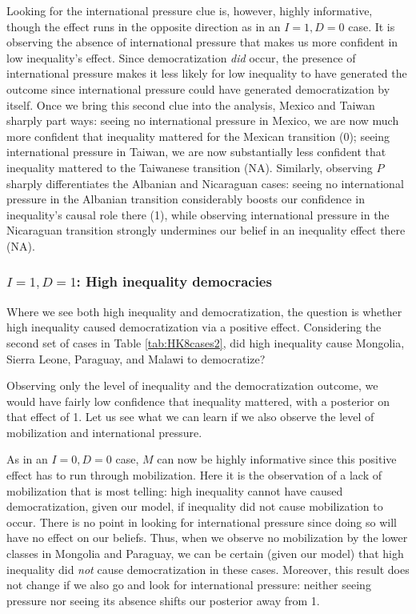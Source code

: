 \documentclass[12pt,]{book}
\begin{document}
Looking for the international pressure clue is, however, highly informative, though the effect runs in the opposite direction as in an \(I=1, D=0\) case. It is observing the absence of international pressure that makes us more confident in low inequality's effect. Since democratization \emph{did} occur, the presence of international pressure makes it less likely for low inequality to have generated the outcome since international pressure could have generated democratization by itself. Once we bring this second clue into the analysis, Mexico and Taiwan sharply part ways: seeing no international pressure in Mexico, we are now much more confident that inequality mattered for the Mexican transition (0); seeing international pressure in Taiwan, we are now substantially less confident that inequality mattered to the Taiwanese transition (NA). Similarly, observing \(P\) sharply differentiates the Albanian and Nicaraguan cases: seeing no international pressure in the Albanian transition considerably boosts our confidence in inequality's causal role there (1), while observing international pressure in the Nicaraguan transition strongly undermines our belief in an inequality effect there (NA).

\hypertarget{i1-d1-high-inequality-democracies}{%
\subsubsection{\texorpdfstring{\(I=1, D=1\): High inequality democracies}{I=1, D=1: High inequality democracies}}\label{i1-d1-high-inequality-democracies}}

Where we see both high inequality and democratization, the question is whether high inequality caused democratization via a positive effect. Considering the second set of cases in Table \ref{tab:HK8cases2}, did high inequality cause Mongolia, Sierra Leone, Paraguay, and Malawi to democratize?

Observing only the level of inequality and the democratization outcome, we would have fairly low confidence that inequality mattered, with a posterior on that effect of 1. Let us see what we can learn if we also observe the level of mobilization and international pressure.

As in an \(I=0, D=0\) case, \(M\) can now be highly informative since this positive effect has to run through mobilization. Here it is the observation of a lack of mobilization that is most telling: high inequality cannot have caused democratization, given our model, if inequality did not cause mobilization to occur. There is no point in looking for international pressure since doing so will have no effect on our beliefs. Thus, when we observe no mobilization by the lower classes in Mongolia and Paraguay, we can be certain (given our model) that high inequality did \emph{not} cause democratization in these cases. Moreover, this result does not change if we also go and look for international pressure: neither seeing pressure nor seeing its absence shifts our posterior away from 1.
\end{document}

